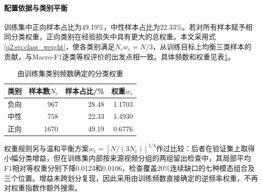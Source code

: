 \paragraph{配置依据与类别平衡}
训练集中正向样本占比为49.19\%，中性样本占比为22.33\%。若对所有样本赋予相同分类权重，正向类别在经验损失中具有更大的总权重。本文采用式\eqref{q2:eq:class_weight}，使各类别满足$N_cw_c=N/3$，从训练目标上均衡三类样本的贡献，与Macro-F1逐类等权评价的出发点相一致。具体频数和权重见表\ref{q2:tab:weights}。
\begin{table}[htbp]\centering\small
\caption{由训练集类别频数确定的分类权重}\label{q2:tab:weights}
\begin{tabular}{lrrr}\toprule
类别 & 样本数$N_c$ & 样本占比/\% & 权重$w_c$\\\midrule
负向 & 967 & 28.48 & 1.1703\\
中性 & 758 & 22.33 & 1.4930\\
正向 & 1670 & 49.19 & 0.6776\\\bottomrule
\end{tabular}\end{table}

权重规则另与温和平衡方案$w_c=[N/(3N_c)]^{1/4}$作过比较：后者在验证集上取得小幅分类增益，但在训练集内部按来源视频分组的两组留出检查中，其局部平均F1相对等权重分别下降0.0123和0.0106，检查覆盖20\%连续缺口的七种模态组合及三个位置。增益未跨划分复现，因此采用由训练频数直接确定的逆频率权重，不再对权重指数作额外搜索。

